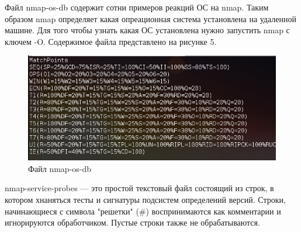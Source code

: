 \documentclass[11pt, a4paper]{article}		%
\begin{document}
Файл nmap-os-db содержит сотни примеров реакций ОС на nmap. Таким образом nmap определяет какая опреационная система установлена на удаленной машине. Для того чтобы узнать какая ОС установлена нужно запустить nmap с ключем -O. Содержимое файла представлено на рисунке 5.

\begin{figure}[h!]
\centering
\includegraphics[scale=0.75]{res/nmap_os_db}
\caption{Файл nmap-os-db}
\end{figure}


nmap-service-probes — это простой текстовый файл состоящий из строк, в котором хнаняться тесты и сигнатуры подсистем определений версий. Строки, начинающиеся с символа "решетки" (\#) воспринимаются как комментарии и игнорируются обработчиком. Пустые строки также не обрабатываются. 
\end{document}
